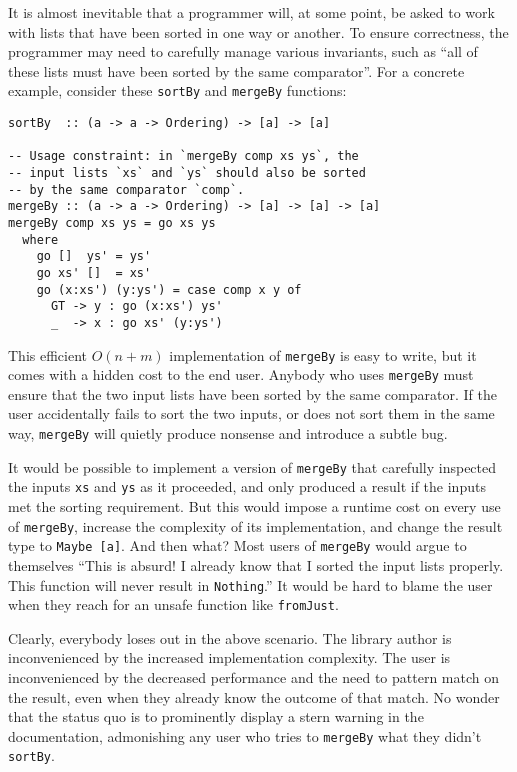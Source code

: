 \documentclass[format=sigplan, review=false, screen=true]{acmart}
\begin{document}
It is almost inevitable that a programmer will, at some point, be asked to work
with lists that have been sorted in one way or another. To ensure correctness,
the programmer may need to carefully manage various invariants, such
as ``all of these lists must have been sorted by the same comparator''. For a concrete
example, consider these \texttt{sortBy} and \texttt{mergeBy} functions:
\begin{verbatim}
sortBy  :: (a -> a -> Ordering) -> [a] -> [a]

-- Usage constraint: in `mergeBy comp xs ys`, the
-- input lists `xs` and `ys` should also be sorted
-- by the same comparator `comp`.
mergeBy :: (a -> a -> Ordering) -> [a] -> [a] -> [a]
mergeBy comp xs ys = go xs ys
  where
    go []  ys' = ys'
    go xs' []  = xs'
    go (x:xs') (y:ys') = case comp x y of
      GT -> y : go (x:xs') ys'
      _  -> x : go xs' (y:ys')
\end{verbatim}
This efficient $O(n+m)$ implementation of \texttt{mergeBy} is easy to write,
but it comes with a hidden cost to the end user. Anybody who uses \texttt{mergeBy}
must ensure that the two input lists have been sorted by the same comparator.
If the user accidentally fails to sort the two inputs, or does not sort them in the same way,
\texttt{mergeBy} will quietly produce nonsense and introduce a subtle bug.

It would be possible to implement a version of \texttt{mergeBy} that
carefully inspected the inputs \texttt{xs} and \texttt{ys} as it
proceeded, and only produced a result if the inputs met the sorting
requirement. But this would impose a runtime cost on every use of
\texttt{mergeBy}, increase the complexity of its implementation,
and change the result type to \texttt{Maybe [a]}. And then what?
Most users of \texttt{mergeBy} would argue to themselves ``This is
absurd! I already know that I sorted the input lists properly. This
function will never result in \texttt{Nothing}.'' It would be hard
to blame the user when they reach for an  unsafe function like
\texttt{fromJust}.

Clearly, everybody loses out in the above scenario. The
library author is inconvenienced by the increased implementation complexity.
The user is inconvenienced by the decreased performance and the need to
pattern match on the result, even when they  already know the
outcome of that match. No wonder that the status quo is to prominently display
a stern warning in the documentation, admonishing
any user who tries to \texttt{mergeBy} what they didn't \texttt{sortBy}.
\end{document}
